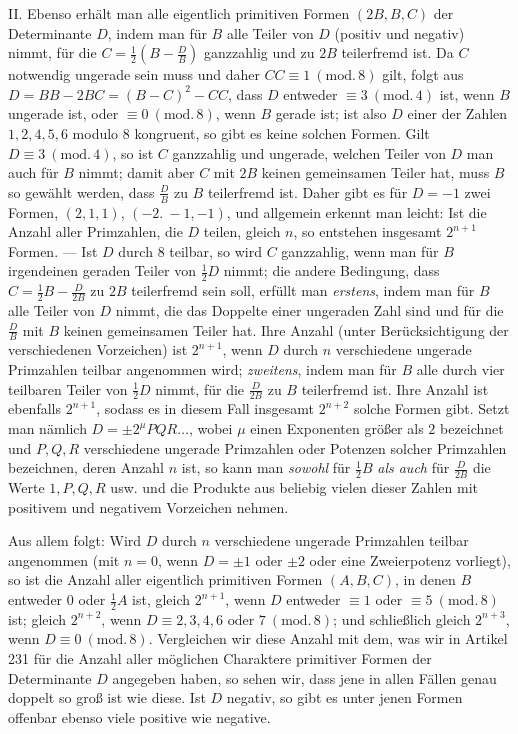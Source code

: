 II. Ebenso erhält man alle eigentlich primitiven Formen \((2B,B,C)\) der Determinante \(D\), indem man für \(B\) alle Teiler von \(D\) (positiv und negativ) nimmt, für die \(C=\frac12(B-\frac{D}{B})\) ganzzahlig und zu \(2B\) teilerfremd ist. Da \(C\) notwendig ungerade sein muss und daher \(CC\equiv1\ (\mathrm{mod.}\,8)\) gilt, folgt aus \(D=BB-2BC=(B-C)^2-CC\), dass \(D\) entweder \(\equiv3\ (\mathrm{mod.}\,4)\) ist, wenn \(B\) ungerade ist, oder \(\equiv0\ (\mathrm{mod.}\,8)\), wenn \(B\) gerade ist; ist also \(D\) einer der Zahlen \(1,2,4,5,6\) modulo \(8\) kongruent, so gibt es keine solchen Formen. Gilt \(D\equiv3\ (\mathrm{mod.}\,4)\), so ist \(C\) ganzzahlig und ungerade, welchen Teiler von \(D\) man auch für \(B\) nimmt; damit aber \(C\) mit \(2B\) keinen gemeinsamen Teiler hat, muss \(B\) so gewählt werden, dass \(\frac{D}{B}\) zu \(B\) teilerfremd ist. Daher gibt es für \(D=-1\) zwei Formen, \((2,1,1)\), \((-2.\ -1,-1)\), und allgemein erkennt man leicht: Ist die Anzahl aller Primzahlen, die \(D\) teilen, gleich \(n\), so entstehen insgesamt \(2^{n+1}\) Formen. --- Ist \(D\) durch \(8\) teilbar, so wird \(C\) ganzzahlig, wenn man für \(B\) irgendeinen geraden Teiler von \(\frac12 D\) nimmt; die andere Bedingung, dass \(C=\frac12 B-\frac{D}{2B}\) zu \(2B\) teilerfremd sein soll, erfüllt man \textit{erstens}, indem man für \(B\) alle Teiler von \(D\) nimmt, die das Doppelte einer ungeraden Zahl sind und für die \(\frac{D}{B}\) mit \(B\) keinen gemeinsamen Teiler hat. Ihre Anzahl (unter Berücksichtigung der verschiedenen Vorzeichen) ist \(2^{n+1}\), wenn \(D\) durch \(n\) verschiedene ungerade Primzahlen teilbar angenommen wird; \textit{zweitens}, indem man für \(B\) alle durch vier teilbaren Teiler von
\(\frac12 D\) nimmt, für die \(\frac{D}{2B}\) zu \(B\) teilerfremd ist. Ihre Anzahl ist ebenfalls \(2^{n+1}\), sodass es in diesem Fall insgesamt \(2^{n+2}\) solche Formen gibt. Setzt man nämlich \(D=\pm2^\mu PQR\ldots\), wobei \(\mu\) einen Exponenten größer als \(2\) bezeichnet und \(P,Q,R\) verschiedene ungerade Primzahlen oder Potenzen solcher Primzahlen bezeichnen, deren Anzahl \(n\) ist, so kann man \textit{sowohl} für \(\frac12 B\) \textit{als auch} für \(\frac{D}{2B}\) die Werte \(1,P,Q,R\) usw. und die Produkte aus beliebig vielen dieser Zahlen mit positivem und negativem Vorzeichen nehmen.

Aus allem folgt: Wird \(D\) durch \(n\) verschiedene ungerade Primzahlen teilbar angenommen (mit \(n=0\), wenn \(D=\pm1\) oder \(\pm2\) oder eine Zweierpotenz vorliegt), so ist die Anzahl aller eigentlich primitiven Formen \((A,B,C)\), in denen \(B\) entweder \(0\) oder \(\frac12 A\) ist, gleich \(2^{n+1}\), wenn \(D\) entweder \(\equiv1\) oder \(\equiv5\ (\mathrm{mod.}\,8)\) ist; gleich \(2^{n+2}\), wenn \(D\equiv2,3,4,6\text{ oder }7\ (\mathrm{mod.}\,8)\); und schließlich gleich \(2^{n+3}\), wenn \(D\equiv0\ (\mathrm{mod.}\,8)\). Vergleichen wir diese Anzahl mit dem, was wir in Artikel 231 für die Anzahl aller möglichen Charaktere primitiver Formen der Determinante \(D\) angegeben haben, so sehen wir, dass jene in allen Fällen genau doppelt so groß ist wie diese. Ist \(D\) negativ, so gibt es unter jenen Formen offenbar ebenso viele positive wie negative.
